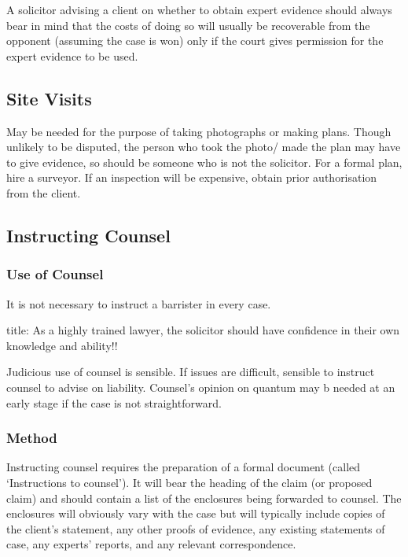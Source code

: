 \documentclass[
]{article}
\newenvironment{Shaded}{}{}
\newcommand{\NormalTok}[1]{#1}
\begin{document}
A solicitor advising a client on whether to obtain expert evidence
should always bear in mind that the costs of doing so will usually be
recoverable from the opponent (assuming the case is won) only if the
court gives permission for the expert evidence to be used.

\hypertarget{site-visits}{%
\subsection{Site Visits}\label{site-visits}}

May be needed for the purpose of taking photographs or making plans.
Though unlikely to be disputed, the person who took the photo/ made the
plan may have to give evidence, so should be someone who is not the
solicitor. For a formal plan, hire a surveyor. If an inspection will be
expensive, obtain prior authorisation from the client.

\hypertarget{instructing-counsel}{%
\subsection{Instructing Counsel}\label{instructing-counsel}}

\hypertarget{use-of-counsel}{%
\subsubsection{Use of Counsel}\label{use-of-counsel}}

It is not necessary to instruct a barrister in every case.

\begin{Shaded}
\begin{Highlighting}[]
\NormalTok{title:}
\NormalTok{As a highly trained lawyer, the solicitor should have confidence in their own knowledge and ability!!}
\end{Highlighting}
\end{Shaded}

Judicious use of counsel is sensible. If issues are difficult, sensible
to instruct counsel to advise on liability. Counsel's opinion on quantum
may b needed at an early stage if the case is not straightforward.

\hypertarget{method}{%
\subsubsection{Method}\label{method}}

Instructing counsel requires the preparation of a formal document
(called `Instructions to counsel'). It will bear the heading of the
claim (or proposed claim) and should contain a list of the enclosures
being forwarded to counsel. The enclosures will obviously vary with the
case but will typically include copies of the client's statement, any
other proofs of evidence, any existing statements of case, any experts'
reports, and any relevant correspondence.
\end{document}
